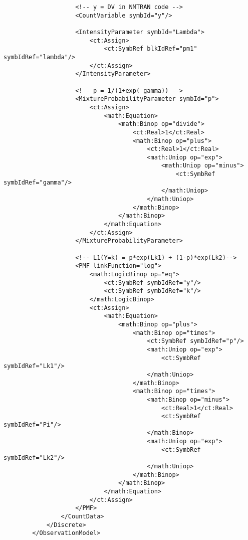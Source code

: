 \begin{lstlisting}
                    <!-- y = DV in NMTRAN code -->
                    <CountVariable symbId="y"/>
                    
                    <IntensityParameter symbId="Lambda">
                        <ct:Assign>
                            <ct:SymbRef blkIdRef="pm1" symbIdRef="lambda"/>
                        </ct:Assign>
                    </IntensityParameter>
                    
                    <!-- p = 1/(1+exp(-gamma)) -->
                    <MixtureProbabilityParameter symbId="p">
                        <ct:Assign>
                            <math:Equation>
                                <math:Binop op="divide">
                                    <ct:Real>1</ct:Real>
                                    <math:Binop op="plus">
                                        <ct:Real>1</ct:Real>
                                        <math:Uniop op="exp">
                                            <math:Uniop op="minus">
                                                <ct:SymbRef symbIdRef="gamma"/>
                                            </math:Uniop>
                                        </math:Uniop>
                                    </math:Binop>
                                </math:Binop>
                            </math:Equation>
                        </ct:Assign>
                    </MixtureProbabilityParameter>
                    
                    <!-- L1(Y=k) = p*exp(Lk1) + (1-p)*exp(Lk2)-->
                    <PMF linkFunction="log">
                        <math:LogicBinop op="eq">
                            <ct:SymbRef symbIdRef="y"/>
                            <ct:SymbRef symbIdRef="k"/>
                        </math:LogicBinop>
                        <ct:Assign>
                            <math:Equation>
                                <math:Binop op="plus">
                                    <math:Binop op="times">
                                        <ct:SymbRef symbIdRef="p"/>
                                        <math:Uniop op="exp">
                                            <ct:SymbRef symbIdRef="Lk1"/>
                                        </math:Uniop>
                                    </math:Binop>
                                    <math:Binop op="times">
                                        <math:Binop op="minus">
                                            <ct:Real>1</ct:Real>
                                            <ct:SymbRef symbIdRef="Pi"/>
                                        </math:Binop>
                                        <math:Uniop op="exp">
                                            <ct:SymbRef symbIdRef="Lk2"/>
                                        </math:Uniop>
                                    </math:Binop>
                                </math:Binop>
                            </math:Equation>
                        </ct:Assign>
                    </PMF>
                </CountData>
            </Discrete>
        </ObservationModel>
\end{lstlisting}



